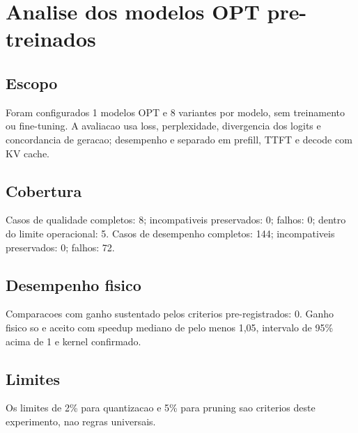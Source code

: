 \chapter{Analise dos modelos OPT pre-treinados}
\section{Escopo}
Foram configurados 1 modelos OPT e 8 variantes por modelo, sem treinamento ou fine-tuning.
A avaliacao usa loss, perplexidade, divergencia dos logits e concordancia de geracao; desempenho e separado em prefill, TTFT e decode com KV cache.
\section{Cobertura}
Casos de qualidade completos: 8; incompativeis preservados: 0; falhos: 0; dentro do limite operacional: 5.
Casos de desempenho completos: 144; incompativeis preservados: 0; falhos: 72.
\section{Desempenho fisico}
Comparacoes com ganho sustentado pelos criterios pre-registrados: 0.
Ganho fisico so e aceito com speedup mediano de pelo menos 1,05, intervalo de 95\% acima de 1 e kernel confirmado.
\section{Limites}
Os limites de 2\% para quantizacao e 5\% para pruning sao criterios deste experimento, nao regras universais.
